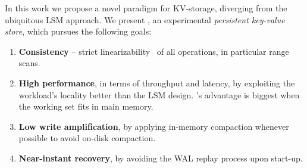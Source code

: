 In this work we propose a novel paradigm for KV-storage, diverging from the ubiquitous LSM approach.  
We present \sys, an experimental {\em persistent key-value store}, which pursues the following goals: 
\begin{enumerate}

\item{\bf Consistency} -- strict linearizability~\cite{Herlihy} of all operations, in particular range scans. 

\item {\bf High performance}, in terms of throughput and latency, by exploiting the workload's  
locality better than the LSM design. \sys's advantage is biggest when the working set fits in main memory. 

\item {\bf Low write amplification}, by applying in-memory compaction whenever possible to avoid 
on-disk compaction. 

\item {\bf Near-instant recovery}, by avoiding the WAL replay process upon start-up. 
\end{enumerate}

